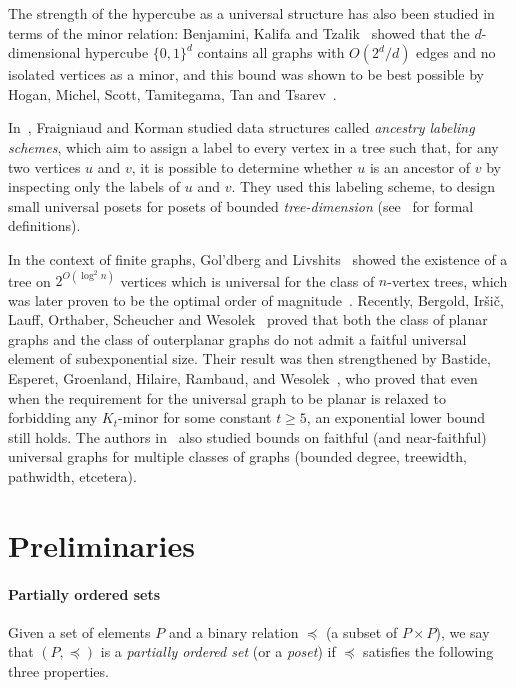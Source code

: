 \documentclass[11pt]{article}
\newcommand{\1}{\mathbbm{1}}
\def\cleq{\preccurlyeq}
\begin{document}
The strength of the hypercube as a universal structure has also been studied in terms of the minor relation: Benjamini, Kalifa and Tzalik~\cite{benjamini2025hypercubeminoruniversality} showed that the $d$-dimensional hypercube $\{0,1\}^d$ 
contains all graphs with $O(2^d/d)$ edges and no isolated vertices as a minor, and this bound was shown to be best possible by Hogan, Michel, Scott, Tamitegama, Tan and Tsarev~\cite{hogan2025tightboundshypercubeminoruniversality}.

In~\cite{fraigniaud2010optimal}, Fraigniaud and Korman studied data structures called \emph{ancestry labeling schemes}, which aim to assign a label to every vertex in a tree such that, for any two vertices $u$ and $v$, it is possible to determine whether $u$ is an ancestor of $v$ by inspecting only the labels of $u$ and $v$. They used this labeling scheme, to design small universal posets for posets of bounded \emph{tree-dimension} (see~\cite{fraigniaud2010optimal} for formal definitions).

In the context of finite graphs, Gol'dberg and Livshits~\cite{GL68} showed the existence of a tree on $2^{O(\log^2 n)}$ vertices which is universal for the class of $n$-vertex trees, which was later proven to be the optimal order of magnitude~\cite{CGC81}. Recently,  Bergold, Ir\v{s}i\v{c}, Lauff, Orthaber, Scheucher and Wesolek~\cite{BILOSW24} proved that both the class of planar graphs and the class of outerplanar graphs do not admit a faitful universal element of subexponential size. 
Their result was then strengthened by Bastide, Esperet, Groenland, Hilaire, Rambaud, and Wesolek~\cite{bastide2025faithful}, who proved that even when the requirement for the universal graph to be planar is relaxed to forbidding any $K_t$-minor for some constant $t \geq 5$, an exponential lower bound still holds. The authors in~\cite{bastide2025faithful} also studied bounds on faithful (and near-faithful) universal graphs for multiple classes of graphs (bounded degree, treewidth, pathwidth, etcetera).  

\section{Preliminaries}
\label{sec:prelim}

\paragraph{Partially ordered sets} Given a set of elements $P$ and a binary relation $\cleq$ (a subset of $P\times P$), we say that $(P,\cleq)$ is a \emph{partially ordered set} (or a \emph{poset}) if $\cleq$ satisfies the following three properties.
\end{document}
